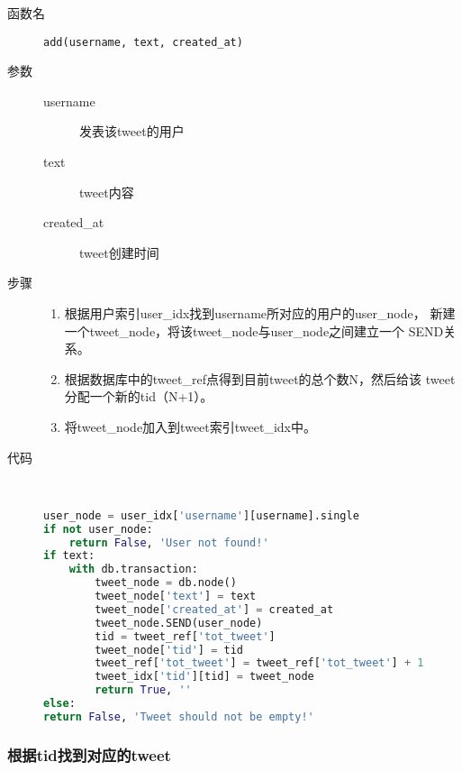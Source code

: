 \documentclass{yaldc}
\begin{document}
\begin{description}
    \item[函数名] \verb|add(username, text, created_at)|
    \item[参数]
        \begin{description}
            \item[username] 发表该tweet的用户
            \item[text] tweet内容
            \item[created\_at] tweet创建时间
        \end{description}
    \item[步骤]
        \begin{enumerate}
            \item 根据用户索引user\_idx找到username所对应的用户的user\_node，
                新建一个tweet\_node，将该tweet\_node与user\_node之间建立一个
                SEND关系。
            \item 根据数据库中的tweet\_ref点得到目前tweet的总个数N，然后给该
                tweet分配一个新的tid（N+1）。
            \item 将tweet\_node加入到tweet索引tweet\_idx中。
        \end{enumerate}
    \item[代码] ~
        \begin{lstlisting}[language=Python]
user_node = user_idx['username'][username].single
if not user_node:
    return False, 'User not found!'
if text:
    with db.transaction:
        tweet_node = db.node()
        tweet_node['text'] = text
        tweet_node['created_at'] = created_at
        tweet_node.SEND(user_node)
        tid = tweet_ref['tot_tweet']
        tweet_node['tid'] = tid
        tweet_ref['tot_tweet'] = tweet_ref['tot_tweet'] + 1
        tweet_idx['tid'][tid] = tweet_node
        return True, ''
else:
return False, 'Tweet should not be empty!'
        \end{lstlisting}
\end{description}

\subsubsection{根据tid找到对应的tweet}
\end{document}
